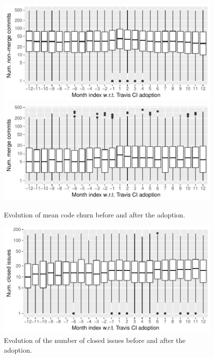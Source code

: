 


\begin{figure}[t]
\centering
\includegraphics[width=\columnwidth, clip=true, trim=0 0 0 0]{figures/freq-non-merge.pdf}
\includegraphics[width=\columnwidth, clip=true, trim=0 0 0 0]{figures/freq-merge.pdf}
\caption{Evolution of mean code churn before and after the \Tvis adoption.}
\label{fig:freq}
\end{figure}

\begin{figure}[t]
\centering
\includegraphics[width=\columnwidth, clip=true, trim=0 0 0 0]{figures/issues.pdf}
\caption{Evolution of the number of closed issues before and after the \Tvis adoption.}
\label{fig:issues}
\end{figure}

